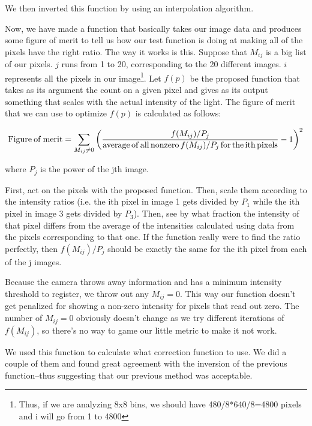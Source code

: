 We then inverted this function by using an interpolation algorithm. 

Now, we have made a function that basically takes our image data and produces some figure of merit to tell us how our test function is doing at making all of the pixels have the right ratio. The way it works is this. Suppose that $M_{i j}$ is a big list of our pixels. $j$ runs from 1 to 20, corresponding to the 20 different images. $i$ represents all the pixels in our image\footnote{Thus, if we are analyzing 8x8 bins, we should have 480/8*640/8=4800 pixels and i will go from 1 to 4800}. Let $f(p)$ be the proposed function that takes as its argument the count on a given pixel and gives as its output something that scales with the actual intensity of the light. The figure of merit that we can use to optimize $f(p)$ is calculated as follows: 

\begin{equation}
{\rm Figure\:of\:merit}=\sum_{ M_{i j}\neq 0}\left(\frac{f(M_{i j})/P_j}{{\rm average\,of\,all\,nonzero\,} f(M_{i j})/P_j {\rm \,for\,the\,ith\,pixels}}-1\right)^2
\end{equation}

where $P_j$ is the power of the jth image.

First, act on the pixels with the proposed function. Then, scale them according to the intensity ratios (i.e. the ith pixel in image 1 gets divided by $P_1$ while the ith pixel in image 3 gets divided by $P_3$). Then, see by what fraction the intensity of that pixel differs from the average of the intensities calculated using data from the pixels corresponding to that one. If the function really were to find the ratio perfectly, then $f(M_{ij})/P_j$ should be exactly the same for the ith pixel from each of the j images. 

Because the camera throws away information and has a minimum intensity threshold to register, we throw out any $M_{i j}=0$. This way our function doesn't get penalized for showing a non-zero intensity for pixels that read out zero. The number of $M_{i j}=0$ obviously doesn't change as we try different iterations of $f(M_{ij})$, so there's no way to game our little metric to make it not work.

We used this function to calculate what correction function to use. We did a couple of them and found great agreement with the inversion of the previous function--thus suggesting that our previous method was acceptable. 
 

%
